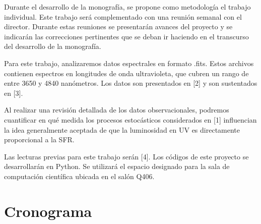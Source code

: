 \documentclass[12pt]{article}
\begin{document}


Durante el desarrollo de la monograf\'ia, se propone como
metodolog\'ia el trabajo individual. Este trabajo ser\'a complementado con una reuni\'on semanal con el director. Durante estas reuniones se presentar\'an avances del proyecto y se indicar\'an las correcciones pertinentes que se deban ir haciendo en el transcurso del desarrollo de la monograf\'ia.

Para este trabajo, analizaremos datos espectrales en formato .fits. Estos archivos contienen espectros en longitudes de onda ultravioleta, que cubren un rango de entre 3650 y 4840 nan\'ometros. Los datos son presentados en [2] y son sustentados en [3].

Al realizar una revisi\'on detallada de los datos observacionales, podremos cuantificar en qu\'e medida los procesos estoc\'asticos considerados en [1] influencian la idea generalmente aceptada de que la luminosidad en UV es directamente proporcional a la SFR.

Las lecturas previas para este trabajo ser\'an [4]. Los c\'odigos de este proyecto se desarrollar\'an en Python. Se utilizar\'a el espacio designado para la sala de computaci\'on cient\'ifica ubicada en el sal\'on Q406.




\section{Cronograma}
\end{document}
